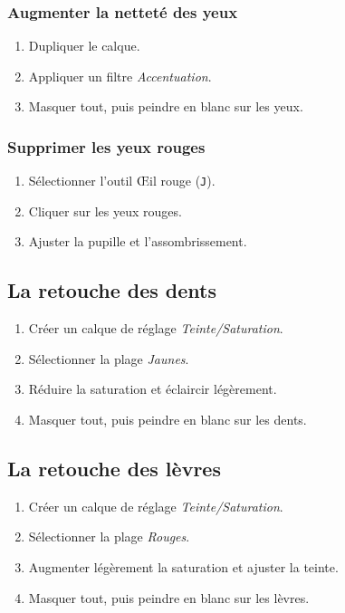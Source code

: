 \subsubsection{Augmenter la netteté des yeux}

\begin{enumerate}
    \item Dupliquer le calque.
    \item Appliquer un filtre \emph{Accentuation}.
    \item Masquer tout, puis peindre en blanc sur les yeux.
\end{enumerate}

\subsubsection{Supprimer les yeux rouges}

\begin{enumerate}
    \item Sélectionner l'outil Œil rouge (\texttt{J}).
    \item Cliquer sur les yeux rouges.
    \item Ajuster la pupille et l'assombrissement.
\end{enumerate}

\subsection{La retouche des dents}

\begin{enumerate}
    \item Créer un calque de réglage \emph{Teinte/Saturation}.
    \item Sélectionner la plage \emph{Jaunes}.
    \item Réduire la saturation et éclaircir légèrement.
    \item Masquer tout, puis peindre en blanc sur les dents.
\end{enumerate}

\subsection{La retouche des lèvres}

\begin{enumerate}
    \item Créer un calque de réglage \emph{Teinte/Saturation}.
    \item Sélectionner la plage \emph{Rouges}.
    \item Augmenter légèrement la saturation et ajuster la teinte.
    \item Masquer tout, puis peindre en blanc sur les lèvres.
\end{enumerate}

